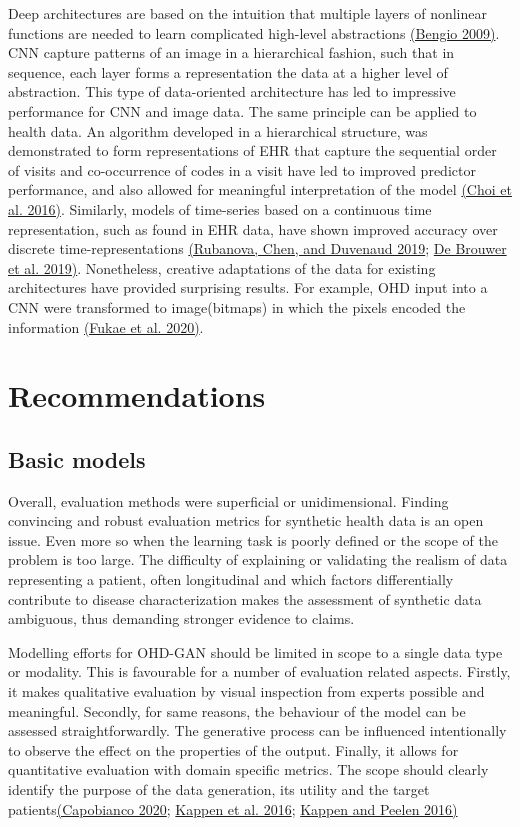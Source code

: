 \documentclass[10pt]{article}
\begin{document}
Deep architectures are based on the intuition that multiple layers of nonlinear functions are needed to learn complicated high-level abstractions \hyperref[csl:60]{(Bengio 2009)}. CNN capture patterns of an image in a hierarchical fashion, such that in sequence, each layer forms a representation the data at a higher level of abstraction. This type of data-oriented architecture has led to impressive performance for CNN and image data. The same principle can be applied to health data. An algorithm developed in a hierarchical structure, was demonstrated to form representations of EHR that capture the sequential order of visits and co-occurrence of codes in a visit have led to improved predictor performance, and also allowed for meaningful interpretation of the model \hyperref[csl:61]{(Choi et al. 2016)}. Similarly, models of time-series based on a continuous time representation, such as found in EHR data, have shown improved accuracy over discrete time-representations \hyperref[csl:62]{(Rubanova, Chen, and Duvenaud 2019}; \hyperref[csl:63]{De Brouwer et al. 2019)}. Nonetheless, creative adaptations of the data for existing architectures have provided surprising results. For example, OHD input into a CNN were transformed to image(bitmaps) in which the pixels encoded the information \hyperref[csl:64]{(Fukae et al. 2020)}.

\section{Recommendations}\label{sec:recommend}
\subsection{Basic models}\label{sec:basic}

Overall, evaluation methods were superficial or unidimensional. Finding convincing and robust evaluation metrics for synthetic health data is an open issue. Even more so when the learning task is poorly defined or the scope of the problem is too large. The difficulty of explaining or validating the realism of data representing a patient, often longitudinal and which factors differentially contribute to disease characterization makes the assessment of synthetic data ambiguous, thus demanding stronger evidence to claims.\par
Modelling efforts for OHD-GAN should be limited in scope to a single data type or modality. This is favourable for a number of evaluation related aspects. Firstly, it makes qualitative evaluation by visual inspection from experts possible and meaningful. Secondly, for same reasons, the behaviour of the model can be assessed straightforwardly. The generative process can be influenced intentionally to observe the effect on the properties of the output. Finally, it allows for quantitative evaluation with domain specific metrics. The scope should clearly identify the purpose of the data generation, its utility and the target patients\hyperref[csl:65]{(Capobianco 2020}; \hyperref[csl:66]{Kappen et al. 2016}; \hyperref[csl:67]{Kappen and Peelen 2016)}
\end{document}
